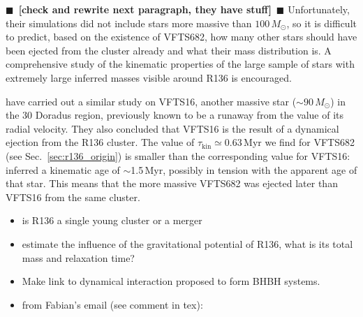 \documentclass[apjl,twocolumn]{emulateapj}
\newcommand{\todo}[1]{{\large $\blacksquare$~\textbf{\color{red}[#1]}}~$\blacksquare$}
\DeclareRobustCommand{\Secref}[1]{Sec.~\ref{#1}}
\begin{document}
\todo{check \cite{banerjee:12} and rewrite next paragraph, they
  have stuff} Unfortunately, their simulations did not include stars more
massive than $100\,M_\odot$, so it is difficult to predict, based on
the existence of VFTS682, how many other stars should have been
ejected from the cluster already and what their mass
distribution is. A comprehensive study of the kinematic properties of the
large sample of stars with extremely large inferred masses visible
around R136 is encouraged.  

\cite{lennon:18} have carried out a similar study on VFTS16, another
massive star ($\sim90\,M_\odot$) in the 30 Doradus region, previously
known to be a runaway from the value of
its radial velocity. They also concluded that VFTS16 is 
the result of a dynamical ejection from the R136 cluster. 
The value of $\tau_\mathrm{kin}\simeq0.63$\,Myr we find for VFTS682 (see \Secref{sec:r136_origin}) is smaller
than the corresponding value for VFTS16: \cite{lennon:18} inferred a kinematic age of
$\sim$1.5\,Myr, possibly in tension with the apparent age of that star. This means that the more
massive VFTS682 was ejected later than VFTS16 from the same cluster.



\begin{itemize}
\item is R136 a single young cluster or a merger
\item estimate the influence of the gravitational potential of R136,
  what is its total mass and relaxation time?
\item Make link to dynamical interaction proposed to form BHBH
  systems.
  \item from Fabian's email (see comment in tex):%
\end{itemize}
\end{document}
